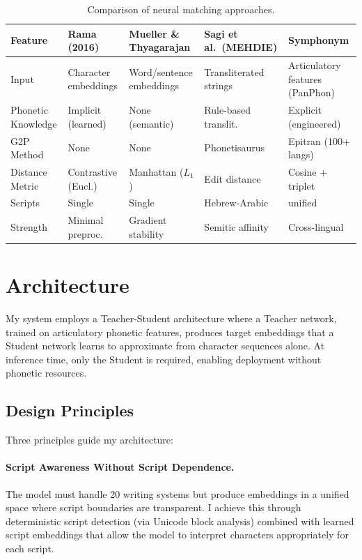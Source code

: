 \documentclass[11pt,a4paper]{article}
\begin{document}
\begin{table}[ht]
\centering
\footnotesize
\setlength{\tabcolsep}{4pt}
\begin{tabular}{@{}>{\raggedright\arraybackslash}p{2.0cm}>{\raggedright\arraybackslash}p{2.0cm}>{\raggedright\arraybackslash}p{2.2cm}>{\raggedright\arraybackslash}p{2.2cm}>{\raggedright\arraybackslash}p{2.8cm}@{}}
\toprule
\textbf{Feature} & \textbf{Rama (2016)}  & \textbf{Mueller \& Thyagarajan} & \textbf{Sagi et al.\ (MEHDIE)} & \textbf{Symphonym} \\
\midrule
Input & Character embeddings & Word/sentence embeddings & Transliterated strings & Articulatory features (PanPhon) \\
\addlinespace
Phonetic Knowledge & Implicit (learned) & None (semantic) & Rule-based translit. & Explicit (engineered) \\
\addlinespace
G2P Method & None & None & Phonetisaurus & Epitran (100+ langs) \\
\addlinespace
Distance Metric & Contrastive (Eucl.) & Manhattan ($L_1$) & Edit distance & Cosine + triplet \\
\addlinespace
Scripts & Single & Single & Hebrew-Arabic & 20 unified \\
\addlinespace
Strength & Minimal preproc. & Gradient stability & Semitic affinity & Cross-lingual \\
\bottomrule
\end{tabular}
\caption{Comparison of neural matching approaches.}
\label{tab:approach-comparison}
\end{table}


\section{Architecture}
\label{sec:architecture}

My system employs a Teacher-Student architecture where a Teacher network, trained on articulatory phonetic features, produces target embeddings that a Student network learns to approximate from character sequences alone. At inference time, only the Student is required, enabling deployment without phonetic resources.

\subsection{Design Principles}

Three principles guide my architecture:

\paragraph{Script Awareness Without Script Dependence.} The model must handle 20 writing systems but produce embeddings in a unified space where script boundaries are transparent. I achieve this through deterministic script detection (via Unicode block analysis) combined with learned script embeddings that allow the model to interpret characters appropriately for each script.
\end{document}
